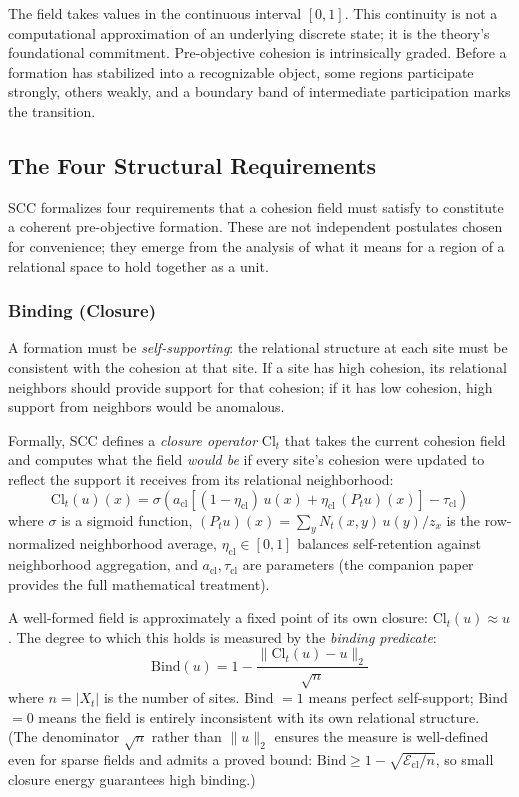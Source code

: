 \documentclass[lettersize,journal]{IEEEtran}
\begin{document}
The field takes values in the continuous interval $[0,1]$. This continuity is not a computational approximation of an underlying discrete state; it is the theory's foundational commitment. Pre-objective cohesion is intrinsically graded. Before a formation has stabilized into a recognizable object, some regions participate strongly, others weakly, and a boundary band of intermediate participation marks the transition.

\subsection{The Four Structural Requirements}

SCC formalizes four requirements that a cohesion field must satisfy to constitute a coherent pre-objective formation. These are not independent postulates chosen for convenience; they emerge from the analysis of what it means for a region of a relational space to hold together as a unit.

\subsubsection{Binding (Closure)}

A formation must be \emph{self-supporting}: the relational structure at each site must be consistent with the cohesion at that site. If a site has high cohesion, its relational neighbors should provide support for that cohesion; if it has low cohesion, high support from neighbors would be anomalous.

Formally, SCC defines a \emph{closure operator} $\mathrm{Cl}_t$ that takes the current cohesion field and computes what the field \emph{would be} if every site's cohesion were updated to reflect the support it receives from its relational neighborhood:
\begin{equation}
\mathrm{Cl}_t(u)(x) = \sigma\!\left(a_{\mathrm{cl}}\left[(1-\eta_{\mathrm{cl}})\,u(x) + \eta_{\mathrm{cl}}\,(P_t u)(x)\right] - \tau_{\mathrm{cl}}\right)
\end{equation}
where $\sigma$ is a sigmoid function, $(P_t u)(x) = \sum_y N_t(x,y)\,u(y)/z_x$ is the row-normalized neighborhood average, $\eta_{\mathrm{cl}} \in [0,1]$ balances self-retention against neighborhood aggregation, and $a_{\mathrm{cl}}, \tau_{\mathrm{cl}}$ are parameters (the companion paper~\cite{paper1} provides the full mathematical treatment).

A well-formed field is approximately a fixed point of its own closure: $\mathrm{Cl}_t(u) \approx u$. The degree to which this holds is measured by the \emph{binding predicate}:
\begin{equation}
\text{Bind}(u) = 1 - \frac{\|\mathrm{Cl}_t(u) - u\|_2}{\sqrt{n}}
\end{equation}
where $n = |X_t|$ is the number of sites. Bind $= 1$ means perfect self-support; Bind $= 0$ means the field is entirely inconsistent with its own relational structure. (The denominator $\sqrt{n}$ rather than $\|u\|_2$ ensures the measure is well-defined even for sparse fields and admits a proved bound: $\text{Bind} \geq 1 - \sqrt{\mathcal{E}_{\mathrm{cl}}/n}$, so small closure energy guarantees high binding.)
\end{document}
